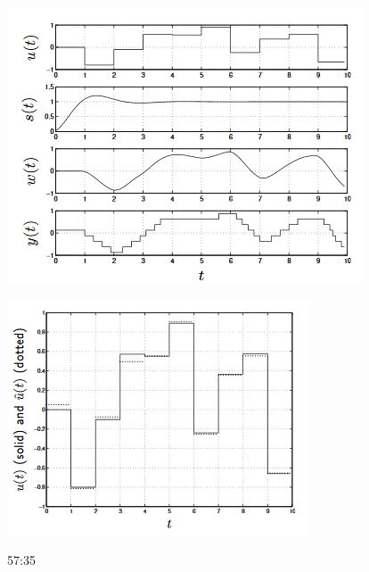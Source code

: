 \documentclass{../tufte-handout}
\begin{document}
\begin{marginfigure}
  \includegraphics[width=\linewidth]{estimation_typical_behavior}
  \caption{.}
  \label{fig:estimation_typical_behavior}
\end{marginfigure}

\begin{marginfigure}
  \includegraphics[width=\linewidth]{estimation_better_approach}
  \caption{.}
  \label{fig:estimation_better_approach}
\end{marginfigure}



57:35




\end{document}
